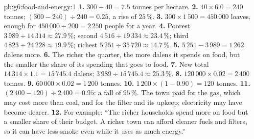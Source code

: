 \begin{solution}{pb:g6:food-and-energy:1}
\textbf{1.} $300 \div 40 = 7.5$ tonnes per hectare.
\textbf{2.} $40 \times 6.0 = 240$ tonnes; $(300 - 240) \div 240 = 0.25$, a rise of
$25\,\%$.
\textbf{3.} $300 \times 1\,500 = 450\,000$ loaves, enough for $450\,000 \div 200 = 2\,250$
people for a year.
\textbf{4.} Poorest $3\,989 \div 14\,314 \approx 27.9\,\%$; second $4\,516 \div 19\,334
\approx 23.4\,\%$; third $4\,823 \div 24\,228 \approx 19.9\,\%$; richest $5\,251 \div
35\,720 \approx 14.7\,\%$.
\textbf{5.} $5\,251 - 3\,989 = 1\,262$ dalens more.
\textbf{6.} The richer the quarter, the more dalens it spends on food, but the
smaller the share of its spending that goes to food.
\textbf{7.} New total $14\,314 \times 1.1 = 15\,745.4$ dalens; $3\,989 \div 15\,745.4
\approx 25.3\,\%$.
\textbf{8.} $120\,000 \times 0.02 = 2\,400$ tonnes.
\textbf{9.} $60\,000 \times 0.02 = 1\,200$ tonnes.
\textbf{10.} $1\,200 \times (1 - 0.90) = 120$ tonnes.
\textbf{11.} $(2\,400 - 120) \div 2\,400 = 0.95$: a fall of $95\,\%$. The town paid
for the gas, which may cost more than coal, and for the filter and its upkeep;
electricity may have become dearer.
\textbf{12.} For example: ``The richer households spend more on food but a smaller
share of their budget. A richer town can afford cleaner fuels and filters, so it can
have less smoke even while it uses as much energy.''
\end{solution}

